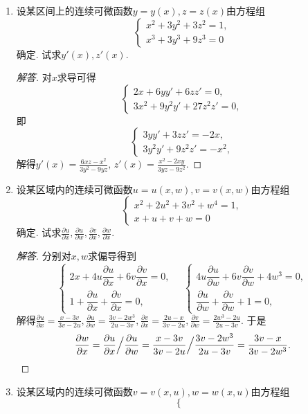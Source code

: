 \begin{2a}
\begin{enumerate}
\begin{proof}[解答]
发现跟三角函数差不多，毕竟不难看出$\ii\sinh(\ii x)=\sin x,\cosh(\ii x)=\cos x$.
\end{proof}
\item 设某区间上的连续可微函数\(y=y(x),z=z(x)\)由方程组\[\begin{cases}
     x^2+3y^2+3z^2=1,\\ x^3+3y^3+9z^3=0
 \end{cases}\]确定. 试求\(y'(x), z'(x)\).
\begin{proof}[解答]
对\(x\)求导可得\[\begin{cases}
2x+6yy'+6zz'=0,\\3x^2+9y^2y'+27z^2z'=0,
\end{cases}\]
即\[\begin{cases}
3yy'+3zz'=-2x,\\3y^2y'+9z^2z'=-x^2,
\end{cases}\]解得\(y'(x)=\frac{6xz-x^2}{3y^2-9yz},\,z'(x)=\frac{x^2-2xy}{3yz-9z^2}\).
\end{proof}
\item 设某区域内的连续可微函数\(u=u(x,w),v=v(x,w)\)由方程组\[\begin{cases}
    x^2+2u^2+3v^2+w^4=1,\\x+u+v+w=0
\end{cases}\]确定. 试求\(\frac{\partial u}{\partial x},\frac{\partial u}{\partial w},\frac{\partial v}{\partial x},\frac{\partial w}{\partial x}.\)
\begin{proof}[解答]
分别对\(x,w\)求偏导得到\[\begin{cases}
2x+4u\dfrac{\partial u}{\partial x}+6v\dfrac{\partial v}{\partial x}=0,\\
1+\dfrac{\partial u}{\partial x}+\dfrac{\partial v}{\partial x}=0,
\end{cases}\quad\begin{cases}
4u\dfrac{\partial u}{\partial w}+6v\dfrac{\partial v}{\partial w}+4w^3=0,\\
\dfrac{\partial u}{\partial w}+\dfrac{\partial v}{\partial w}+1=0,
\end{cases}\]解得\(\frac{\partial u}{\partial x}=\frac{x-3v}{3v-2u},\frac{\partial u}{\partial w}=\frac{3v-2w^3}{2u-3v},\frac{\partial v}{\partial x}=\frac{2u-x}{3v-2u},\frac{\partial v}{\partial w}=\frac{2w^3-2u}{2u-3v}\). 于是
\[\frac{\partial w}{\partial x}=\frac{\partial u}{\partial x}\Big/\frac{\partial u}{\partial w}
=\frac{x-3v}{3v-2u}\Big/\frac{3v-2w^3}{2u-3v}=\frac{3v-x}{3v-2w^3}.\qedhere\]
\end{proof}
\item 设某区域内的连续可微函数\(v=v(x,u),w=w(x,u)\)由方程组\[\begin{cases}

\end{cases}\]
\end{enumerate}
\end{2a}
